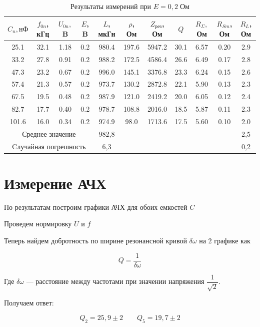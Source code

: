 \documentclass[a4paper, 12pt]{article}
\begin{document}
\begin{table}[h!]
	\centering
	\caption{Результаты измерений при $ E = 0,2 \; Ом $}
\begin{tabular}{|c|c|c|c|c|c|c|c|c|c|c|}
	\hline
	$ C_n, нФ $ & $ f_{0n} $, кГц & $ U_{0n}, $ B & $ E $, B & $ L $, мкГн & $ \rho $, Ом & $ Z_{рез} $, Ом & $ Q $ & $ R_\Sigma,  $ Ом & $ R_{Sm} $, Ом & $ R_L $, Ом \\
	\hline
25.1 & 32.1 & 1.18 & 0.2 & 980.4 & 197.6 & 5947.2 & 30.1 & 6.57 & 0.20 & 2.9 \\
33.2 & 27.8 & 0.91 & 0.2 & 988.2 & 172.5 & 4586.4 & 26.6 & 6.49 & 0.17 & 2.8 \\
47.3 & 23.2 & 0.67 & 0.2 & 996.0 & 145.1 & 3376.8 & 23.3 & 6.24 & 0.15 & 2.6 \\
57.4 & 21.3 & 0.57 & 0.2 & 973.7 & 130.2 & 2872.8 & 22.1 & 5.90 & 0.13 & 2.3 \\
67.5 & 19.5 & 0.48 & 0.2 & 987.9 & 121.0 & 2419.2 & 20.0 & 6.05 & 0.12 & 2.4 \\
82.7 & 17.7 & 0.40 & 0.2 & 978.7 & 108.8 & 2016.0 & 18.5 & 5.87 & 0.11 & 2.3 \\
101.6 & 16.0 & 0.34 & 0.2 & 974.9 & 98.0 & 1713.6 & 17.5 & 5.60 & 0.10 & 2.0 \\
	\hline
	\multicolumn{4}{|c|}{Среднее значение} & 982,8 & & & & & & 2,5\\
	\multicolumn{4}{|c|}{Cлучайная погрешность} & 6,3 & & & & & & 0,2\\
	\hline
\end{tabular}
	\label{resC1}%
\end{table}%
\section{Измерение АЧХ}


По результатам построим графики АЧХ для обоих емкостей $C$


Проведем нормировку $U$ и $f$

Теперь найдем добротность по ширине резонансной кривой $ \delta\omega $ на 2 графике как 

\begin{equation}\label{}
Q = \dfrac{1}{\delta\omega}
\end{equation}  

Где $ \delta\omega $ --- расстояние между частотами при значении напряжения $ \dfrac{1}{\sqrt{2}} $.

Получаем ответ: 

\begin{equation}\label{}
Q_2 = 25,9 \pm 2 \qquad Q_5 = 19,7 \pm 2
\end{equation}
\end{document}
